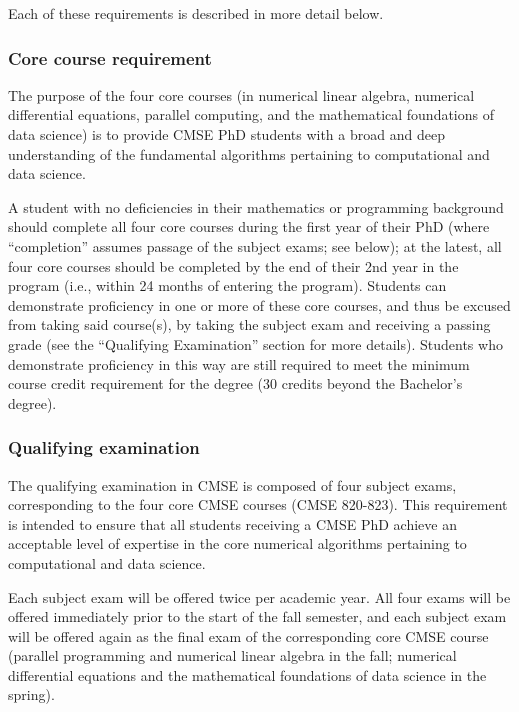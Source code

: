 Each of these requirements is described in more detail below.

\vspace{3mm}
\subsubsection{Core course requirement}
\label{sec:core_courses}

The purpose of the four core courses (in numerical linear algebra,
numerical differential equations, parallel computing, and the
mathematical foundations of data science) is to provide CMSE PhD
students with a broad and deep understanding of the fundamental
algorithms pertaining to computational and data science.

A student with no deficiencies in their mathematics or programming
background should complete all four core courses during the first year
of their PhD (where ``completion'' assumes passage of the subject exams;
see below); at the latest, all four core courses should be completed
by the end of their 2nd year in the program (i.e., within 24 months of
entering the program).  Students can demonstrate proficiency in
one or more of these core courses, and thus be excused from taking
said course(s), by taking the subject exam and receiving a passing
grade (see the ``Qualifying Examination'' section for more details).
Students who demonstrate proficiency in this way are still required to
meet the minimum course credit requirement for the degree (30 credits
beyond the Bachelor's degree).

\vspace{3mm}
\subsubsection{Qualifying examination}
\label{sec:qual_exam}

The qualifying examination in CMSE is composed of four subject exams,
corresponding to the four core CMSE courses (CMSE 820-823). This
requirement is intended to ensure that all students receiving a CMSE
PhD achieve an acceptable level of expertise in the core numerical
algorithms pertaining to computational and data science.  

Each subject exam will be offered twice per academic year.  All four
exams will be offered immediately prior to the start of the fall
semester, and each subject exam will be offered again as the final
exam of the corresponding core CMSE course (parallel programming and
numerical linear algebra in the fall; numerical differential equations
and the mathematical foundations of data science in the spring).

